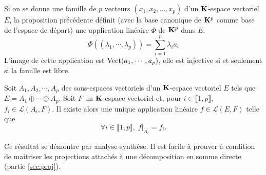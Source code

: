\begin{rem}
  Si on se donne une famille de $p$ vecteurs $(x_1,x_2,\ldots,x_p)$ d'un $\mathbf{K}$-espace vectoriel $E$, la proposition précédente définit (avec la base canonique de $\mathbf{K}^p$ comme base de l'espace de départ) une application lin\'eaire $\Phi$ de $\mathbf{K}^p$ dans $E$.
  \begin{displaymath}
    \Phi((\lambda_1,\cdots,\lambda_p)) = \sum_{i=1}^p \lambda_i a_i
  \end{displaymath}
L'image de cette application est $\mathop{\mathrm{Vect}}(a_1,\cdots,a_p)$, elle est injective si et seulement si la famille est libre.
\end{rem}

\begin{propn}
  Soit $A_1, A_2, \cdots, A_p$ des sous-espaces vectoriels d'un $\mathbf{K}$-espace vectoriel $E$ tels que $E = A_1 \oplus \cdots \oplus A_p$.
Soit $F$ un $\mathbf{K}$-espace vectoriel et, pour $i \in \llbracket 1, p \rrbracket$,  $f_i \in \mathcal{L}(A_i,F)$. \newline
Il existe alors une unique application linéaire $f \in \mathcal{L}(E,F)$ telle que 
\begin{displaymath}
  \forall i \in \llbracket 1, p \rrbracket, \; f|_{A_i} = f_i.
\end{displaymath}
\end{propn}
\begin{demo}
  Ce résultat se démontre par analyse-synthèse. Il est facile à prouver à condition de maitriser les projections attachés à une décomposition en somme directe (partie \ref{sec:proj}).
\end{demo}

